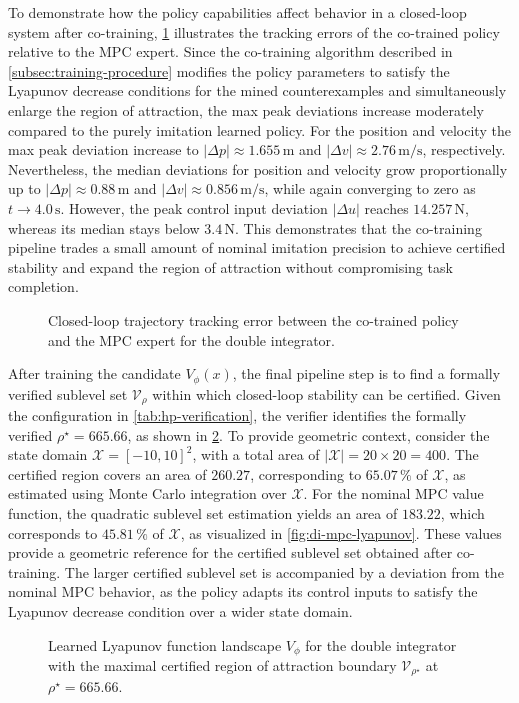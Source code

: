 To demonstrate how the policy capabilities affect behavior in a closed-loop system after co-training, \cref{fig:di-colearn-policy-error-bands} 
illustrates the tracking errors of the co-trained policy relative to the MPC expert. 
Since the co-training algorithm described in \cref{subsec:training-procedure} modifies the policy parameters to satisfy 
the Lyapunov decrease conditions for the mined counterexamples and simultaneously enlarge the region of attraction, 
the max peak deviations increase moderately compared to the purely imitation learned policy. 
For the position and velocity the max peak deviation increase to $|\Delta p| \approx 1.655\,\text{m}$ and 
$|\Delta v| \approx 2.76\,\text{m/s}$, respectively. 
Nevertheless, the median deviations for position and velocity grow proportionally up to $|\Delta p| \approx 0.88\,\text{m}$ and 
$|\Delta v| \approx 0.856\,\text{m/s}$, while again converging to zero as $t \to 4.0\,\text{s}$. 
However, the peak control input deviation $|\Delta u|$ reaches $14.257\,\text{N}$, whereas its median stays below $3.4\,\text{N}$.
This demonstrates that the co-training pipeline trades a small amount of nominal imitation precision to 
achieve certified stability and expand the region of attraction without compromising task completion.
\begin{figure}[htbp]
    \centering
    
    \caption{Closed-loop trajectory tracking error between the co-trained policy and the MPC expert for the double integrator.}
    \label{fig:di-colearn-policy-error-bands}
\end{figure}

After training the candidate $V_\phi(x)$, the final pipeline step is to find a formally verified sublevel set $\mathcal{V}_\rho$ 
within which closed-loop stability can be certified. Given the configuration in \cref{tab:hp-verification}, the verifier identifies the 
formally verified $\rho^\star = 665.66$, as shown in \cref{fig:di-roa}. To provide geometric context, consider the state domain 
$\mathcal{X} = [-10,10]^2$, with a total area of $|\mathcal{X}| = 20 \times 20 = 400$. The certified region covers an area of $260.27$, 
corresponding to $65.07\,\%$ of $\mathcal{X}$, as estimated using Monte Carlo integration over $\mathcal{X}$.
For the nominal MPC value function, the quadratic sublevel set estimation yields an area of $183.22$, 
which corresponds to $45.81\,\%$ of $\mathcal{X}$, as visualized in \cref{fig:di-mpc-lyapunov}. 
These values provide a geometric reference for the certified sublevel set obtained after co-training.
The larger certified sublevel set is accompanied by a deviation from the nominal MPC behavior, as the policy adapts 
its control inputs to satisfy the Lyapunov decrease condition over a wider state domain.
\begin{figure}[htbp]
    \centering
    
    \caption{Learned Lyapunov function landscape $V_\phi$ for the double integrator with the maximal certified region of attraction 
        boundary $\mathcal{V}_{\rho^\star}$ at $\rho^\star = 665.66$.}
    \label{fig:di-roa}
\end{figure}

